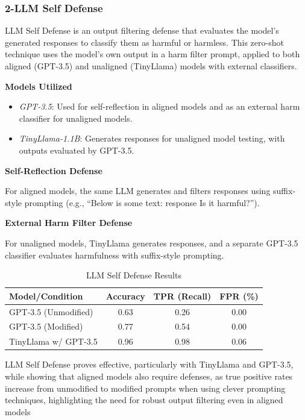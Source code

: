 \documentclass[conference]{IEEEtran}
\begin{document}
\subsubsection*{2-LLM Self Defense} 
LLM Self Defense is an output filtering defense that evaluates the model’s generated responses to classify them as harmful or harmless. This zero-shot technique uses the model’s own output in a harm filter prompt, applied to both aligned (GPT-3.5) and unaligned (TinyLlama) models with external classifiers.

\textbf{Models Utilized}

\begin{itemize}[left=0pt, topsep=2pt, itemsep=2pt]
    \item \textit{GPT-3.5}: Used for self-reflection in aligned models and as an external harm classifier for unaligned models.
    \item \textit{TinyLlama-1.1B}: Generates responses for unaligned model testing, with outputs evaluated by GPT-3.5.
\end{itemize}

\textbf{Self-Reflection Defense}

For aligned models, the same LLM generates and filters responses using suffix-style prompting (e.g., “Below is some text: response Is it harmful?”).

\textbf{External Harm Filter Defense}

For unaligned models, TinyLlama generates responses, and a separate GPT-3.5 classifier evaluates harmfulness with suffix-style prompting.
\begin{table}[h]
\centering
\caption{LLM Self Defense Results}
\label{tab:llm_self_defense_results}
\begin{tabular}{lccc}
\toprule
\textbf{Model/Condition} & \textbf{Accuracy} & \textbf{TPR (Recall)} & \textbf{FPR (\%)} \\
\midrule
GPT-3.5 (Unmodified) & 0.63 & 0.26 & 0.00 \\
GPT-3.5 (Modified) & 0.77 & 0.54 & 0.00 \\
TinyLlama w/ GPT-3.5 & 0.96 & 0.98 & 0.06 \\
\bottomrule
\end{tabular}
\end{table}
\newline
LLM Self Defense proves effective, particularly with TinyLlama and GPT-3.5, while showing that aligned models also require defenses, as true positive rates increase from unmodified to modified prompts when using clever prompting techniques, highlighting the need for robust output filtering even in aligned models
\end{document}
